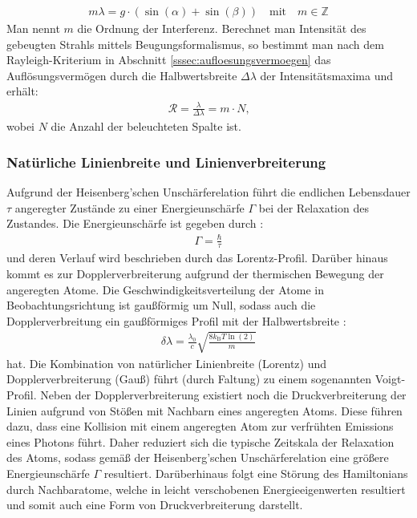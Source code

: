 \documentclass[11pt, a4paper]{article}
\numberwithin{equation}{section}
\begin{document}
\begin{align}
	m \lambda = g \cdot \left( \sin(\alpha) + \sin(\beta) \right) \quad \text{mit} \quad m \in \mathbb{Z}
\end{align}
Man nennt $m$ die Ordnung der Interferenz.
Berechnet man Intensität des gebeugten Strahls mittels Beugungsformalismus, so bestimmt man nach dem Rayleigh-Kriterium in Abschnitt \ref{sssec:aufloesungsvermoegen} das Auflösungsvermögen durch die Halbwertsbreite $\Delta \lambda$ der Intensitätsmaxima und erhält:
\begin{align}
	\mathcal{R} = \frac{\lambda}{\Delta \lambda} = m \cdot N \text{,}
\end{align}
wobei $N$ die Anzahl der beleuchteten Spalte ist.

\subsubsection{Natürliche Linienbreite und Linienverbreiterung}
Aufgrund der Heisenberg'schen Unschärferelation führt die endlichen Lebensdauer $\tau$ angeregter Zustände zu einer Energieunschärfe $\Gamma$ bei der Relaxation des Zustandes.
Die Energieunschärfe ist gegeben durch \cite{demtroder}:
\begin{align*}
\Gamma = \frac{\hbar}{\tau}
\end{align*}
und deren Verlauf wird beschrieben durch das Lorentz-Profil.
Darüber hinaus kommt es zur Dopplerverbreiterung aufgrund der thermischen Bewegung der angeregten Atome.
Die Geschwindigkeitsverteilung der Atome in Beobachtungsrichtung ist gaußförmig um Null, sodass auch die Dopplerverbreitung ein gaußförmiges Profil mit der Halbwertsbreite \cite{demtroder}:
\begin{align}
\delta \lambda = \frac{\lambda_0}{c} \sqrt{\frac{8 k_\mathrm{B} T \ln(2)}{m}}
\label{eq:doppler}
\end{align}
hat.
Die Kombination von natürlicher Linienbreite (Lorentz) und Dopplerverbreiterung (Gauß) führt (durch Faltung) zu einem sogenannten Voigt-Profil.
Neben der Dopplerverbreiterung existiert noch die Druckverbreiterung der Linien aufgrund von Stößen mit Nachbarn eines angeregten Atoms.
Diese führen dazu, dass eine Kollision mit einem angeregten Atom zur verfrühten Emissions eines Photons führt.
Daher reduziert sich die typische Zeitskala der Relaxation des Atoms, sodass gemäß der Heisenberg'schen Unschärferelation eine größere Energieunschärfe $\Gamma$ resultiert.
Darüberhinaus folgt eine Störung des Hamiltonians durch Nachbaratome, welche in leicht verschobenen Energieeigenwerten resultiert und somit auch eine Form von Druckverbreiterung darstellt.
\end{document}
